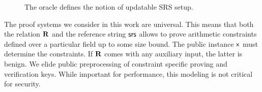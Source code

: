 \begin{figure}[t!]
	\centering
	\centerline{}
	\caption{The oracle defines the notion of updatable SRS setup.} 
		\label{fig:upd}
\end{figure}

 The proof systems we consider in this work are universal. This means that both the relation $\mathbf{R}$ and the reference string $\mathsf{srs}$ allows to prove arithmetic constraints defined over a particular field up to some size bound. The public instance $\mathsf{x}$ must determine the constraints. 
If $\mathbf{R}$ comes with any auxiliary input, the latter is benign. 
We elide public preprocessing of constraint specific proving and verification keys. While important for performance, this modeling is not critical for security.



